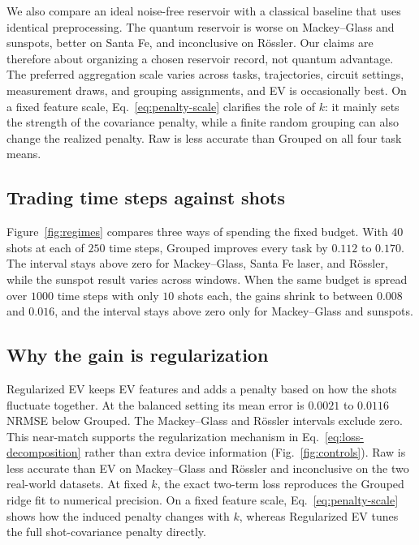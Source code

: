 We also compare an ideal noise-free reservoir with a classical baseline that
uses identical preprocessing. The quantum reservoir is worse on Mackey--Glass
and sunspots, better on Santa Fe, and inconclusive on R\"ossler. Our claims are
therefore about organizing a chosen reservoir record, not quantum advantage.
The preferred aggregation scale varies across tasks, trajectories, circuit
settings, measurement draws, and grouping assignments, and EV is occasionally
best. On a fixed feature scale, Eq.~\eqref{eq:penalty-scale}
clarifies the role of $k$: it mainly sets the strength of the covariance
penalty, while a finite random grouping can also change the realized penalty.
Raw is less accurate than
Grouped on all four task means.

\subsection{Trading time steps against shots}

Figure~\ref{fig:regimes} compares three ways of spending the fixed budget. With
$40$ shots at each of $250$ time steps, Grouped improves every task by
$0.112$ to $0.170$. The interval stays above zero for Mackey--Glass, Santa Fe
laser, and R\"ossler, while the sunspot result varies across windows. When the
same budget is spread over $1000$ time steps with only $10$ shots each, the
gains shrink to between $0.008$ and $0.016$, and the interval stays above zero
only for Mackey--Glass and sunspots.

\subsection{Why the gain is regularization}

Regularized EV keeps EV features and adds a penalty based on how the shots fluctuate
together. At the balanced setting its mean error is $0.0021$ to $0.0116$ NRMSE
below Grouped. The Mackey--Glass and R\"ossler intervals exclude zero. This near-match
supports the regularization mechanism in Eq.~\eqref{eq:loss-decomposition}
rather than extra device information (Fig.~\ref{fig:controls}). Raw is less
accurate than EV on Mackey--Glass and R\"ossler and inconclusive on the two
real-world datasets. At fixed $k$, the exact two-term loss reproduces the
Grouped ridge fit to numerical precision. On a fixed feature scale,
Eq.~\eqref{eq:penalty-scale} shows how the induced penalty changes
with $k$, whereas Regularized EV tunes the full shot-covariance penalty directly.

